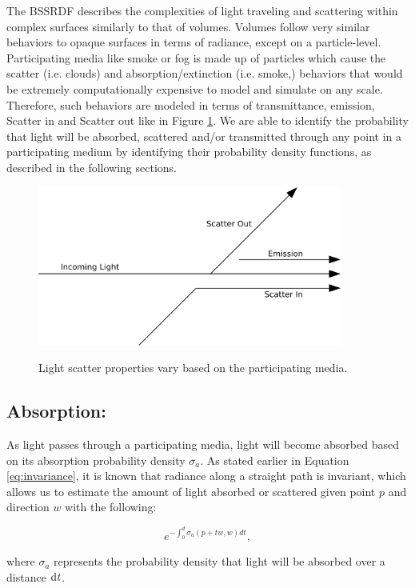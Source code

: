 \documentclass[12pt]{ucthesis}
\newcommand{\captionfonts}{\small\bf\ssp}
\begin{document}
The BSSRDF describes the complexities of light traveling and scattering within complex surfaces similarly to that of volumes.  Volumes follow very similar behaviors to opaque surfaces in terms of radiance, except on a particle-level.  Participating media like smoke or fog is made up of particles which cause the scatter (i.e. clouds) and absorption/extinction (i.e. smoke,) behaviors that would be extremely computationally expensive to model and simulate on any scale.  Therefore, such behaviors are modeled in terms of transmittance, emission, Scatter in and Scatter out like in Figure \ref{fig:vol_scat}.  We are able to identify the probability that light will be absorbed, scattered and/or transmitted through any point in a participating medium by identifying their probability density functions, as described in the following sections. 
\begin{figure}[h!]
    \centering
    \includegraphics[width=100mm]{img/diag/vol_scatter.pdf}
    \captionfonts
    \caption{Light scatter properties vary based on the participating media.}
    \label{fig:vol_scat}
\end{figure}

\subsection{Absorption:}
As light passes through a participating media, light will become absorbed based on its absorption probability density $\sigma_{a}$. As stated earlier in Equation \ref{eq:invariance}, it is known that radiance along a straight path is invariant, which allows us to estimate the amount of light absorbed or scattered given point $p$ and direction $w$ with the following:

\begin{equation}
e^{-\int_{0}^{d}\sigma_{a} (p+t\mathit{w},\mathit{w})d\mathit{t}},
\label{siga_eq}
\end{equation}

where $\sigma_{a}$ represents the probability density that light will be absorbed over a distance $\textup{d}\mathit{t}$.
\end{document}
